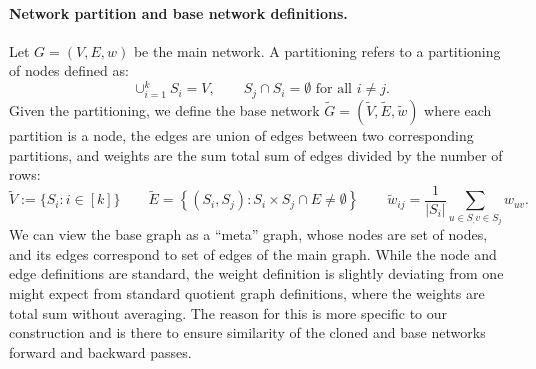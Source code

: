 \documentclass{article}
\newcommand{\BaseW}{\widetilde{w}}
\newcommand{\BaseG}{\widetilde{G}}
\newcommand{\BaseV}{\widetilde{V}}
\newcommand{\BaseE}{\widetilde{E}}
\numberwithin{figure}{section}
\begin{document}
\paragraph{Network partition and base network definitions.}
Let $G = (V, E, w)$ be the main network. A partitioning refers to a partitioning of nodes defined as:
$$
\cup_{i=1}^k S_i = V, \qquad S_j\cap S_i=\emptyset\text{ for all } i\neq j.
$$
Given the partitioning, we  define the base network $\BaseG = (\BaseV, \BaseE, \BaseW)$ where each partition is a node, the edges are union of edges between two corresponding partitions, and weights are the sum total sum of edges divided by the number of rows:
$$
\BaseV:=\{S_i: i\in[k]\}
\qquad 
\BaseE = \left\{(S_i,S_j): S_i\times S_j\cap E\neq \emptyset \right\}
\qquad
\BaseW_{ij} = \frac{1}{|S_i|}\sum_{u\in S_,v\in S_j} w_{uv}.
$$
We can view the base graph as a ``meta'' graph, whose nodes are set of nodes, and its edges correspond to set of edges of the main graph. While the node and edge definitions are standard, the weight definition is slightly deviating from one might expect from standard quotient graph definitions, where the weights are total sum without averaging. The reason for this is more specific to our construction and is there to ensure similarity of the cloned and base networks forward and backward passes. 
\end{document}
